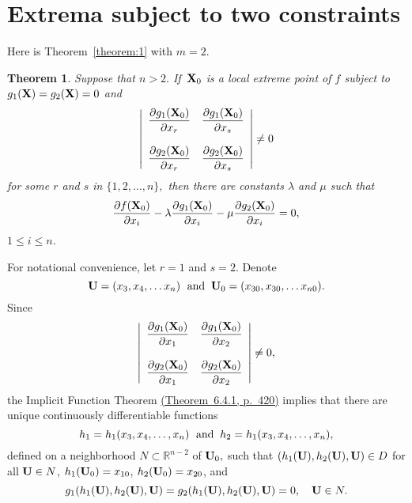 \documentclass{article}
\newtheorem{theorem}{Theorem}
\newcommand{\proof}{\noindent{\sc\bf Proof}\quad }
\newcommand{\dst}{\displaystyle}
\begin{document}
\section{Extrema subject to  two constraints} \label{section:5}
Here is Theorem~\ref{theorem:1} with $m=2$.

\begin{theorem} \label{theorem:3}
Suppose that $n>2.$ If\, ${\bf X}_{0}$ is a local extreme point of $f$
subject to
$g_{1}({\bf X})=g_{2}({\bf X})=0$ and
\begin{equation} \label{eq:19}
\left|\begin{array}{ccccccc}
\dst{\frac{{\partial g_{1}({\bf X}_{0})}}{{\partial  x_{r}}}}&
\dst{\frac{{\partial g_{1}({\bf X}_{0})}}{{\partial  x_{s}}}}\\\\
\dst{\frac{{\partial g_{2}({\bf X}_{0})}}{{\partial  x_{r}}}}&
\dst{\frac{{\partial g_{2}({\bf X}_{0})}}{{\partial  x_{s}}}}\\
\end{array}\right|\ne0
\end{equation}
for some $r$ and $s$ in $\{1,2,\dots,n\},$  then
there are constants  $\lambda$ and $\mu$  such that
\begin{equation} \label{eq:20}
\frac{{\partial f({\bf X}_{0})}}{{\partial x_{i}}}-
\lambda\frac{{\partial g_{1}({\bf X}_{0})}}{{\partial x_{i}}}-
\mu\frac{{\partial g_{2}({\bf X}_{0})}}{{\partial x_{i}}}=0,
\end{equation}
$1\le i\le n$.
\end{theorem}

\proof
For notational convenience, let $r=1$ and $s=2$.  Denote
$$
{\bf U}=(x_{3},x_{4},\dots x_{n})\text{\; and\;\;}
{\bf U}_{0}=(x_{30},x_{30},\dots x_{n0}).
$$
Since
\begin{equation} \label{eq:21}
\left|\begin{array}{ccccccc}
\dst{\frac{{\partial g_{1}({\bf X}_{0})}}{{\partial  x_{1}}}}&
\dst{\frac{{\partial g_{1}({\bf X}_{0})}}{{\partial  x_{2}}}}\\\\
\dst{\frac{{\partial g_{2}({\bf X}_{0})}}{{\partial  x_{1}}}}&
\dst{\frac{{\partial g_{2}({\bf X}_{0})}}{{\partial  x_{2}}}}\\
\end{array}\right|\ne0,
\end{equation}
the Implicit Function Theorem
\href{http://ramanujan.math.trinity.edu/wtrench/texts/TRENCH_REAL_ANALYSIS.PDF}
{(Theorem~6.4.1, p.~420)}
implies that there  are unique continuously differentiable functions
$$
h_{1}=h_{1}(x_{3},x_{4},\dots,x_{n})\text{\; and\;\;}
h_{2}=h_{1}(x_{3},x_{4},\dots,x_{n}),
$$
 defined on a neighborhood $N\subset{\mathbb R}^{n-2}$ of
${\bf U}_{0},$  such that $(h_{1}({\bf
U}),h_{2}({\bf U}),{\bf U})\in D$ for all ${\bf U}\in N$,
  $h_{1}({\bf U}_{0})=x_{10}$,
$h_{2}({\bf U}_{0})=x_{20}$, and
\begin{equation} \label{eq:22}
g_{1}(h_{1}({\bf U}),h_{2}({\bf U}),{\bf U})=
g_{2}(h_{1}({\bf U}),h_{2}({\bf U}),{\bf U})=0,\quad  {\bf U}\in N.
\end{equation}
\end{document}
